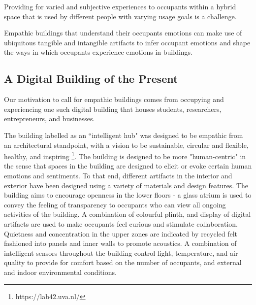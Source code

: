 \documentclass[manuscript, anonymous, review]{acmart}
\begin{document}
Providing for varied and subjective experiences to occupants within a hybrid space that is used by different people with varying usage goals is a challenge. 

Empathic buildings that understand their occupants emotions can make use of ubiquitous tangible and intangible artifacts to infer occupant emotions and shape the ways in which occupants experience emotions in buildings.


\subsection{A Digital Building of the Present}
\label{subsec:building}
Our motivation to call for empathic buildings comes from occupying and experiencing one such digital building that houses students, researchers, entrepreneurs, and businesses.

The building labelled as an ``intelligent hub" was designed to be empathic from an architectural standpoint, with a vision to be sustainable, circular and flexible, healthy, and inspiring \footnote{https://lab42.uva.nl/}. The building is designed to be more "human-centric" in the sense that spaces in the building are designed to elicit or evoke certain human emotions and sentiments. To that end, different artifacts in the interior and exterior have been designed using a variety of materials and design features. The building aims to encourage openness in the lower floors - a glass atrium is used to convey the feeling of transparency to occupants who can view all ongoing activities of the building.  A combination of colourful plinth, and display of digital artifacts are used to make occupants feel curious and stimulate collaboration. Quietness and concentration in the upper zones are indicated by recycled felt fashioned into panels and inner walls to promote acoustics. A combination of intelligent sensors throughout the building control light, temperature, and air quality to provide for comfort based on the number of occupants, and external and indoor environmental conditions.
\end{document}
